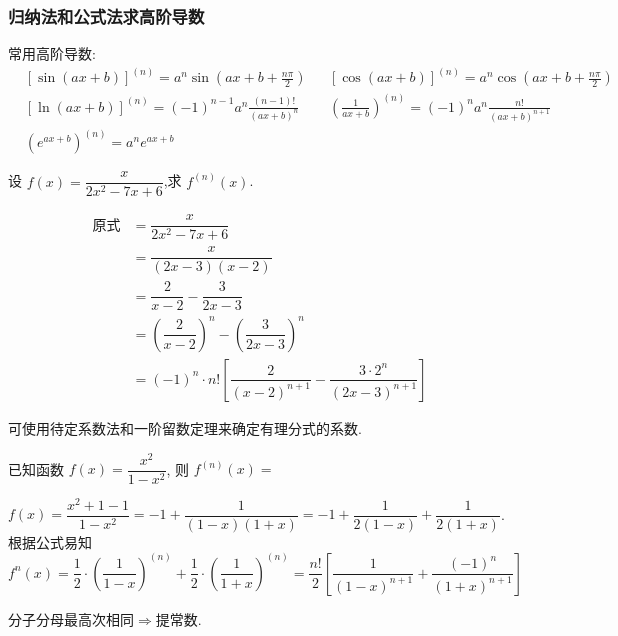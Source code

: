 \documentclass[8pt a4paper, oneside, UTF8]{ctexbook}  %
\begin{document}
\begin{sloppypar}
    \subsubsection{归纳法和公式法求高阶导数}
    常用高阶导数:
    $$
    \boxed{ \begin{aligned}
        &\left[\sin(ax+b)\right]^{(n)}=a^{n}\sin\left(ax+b+\frac{n\pi}{2}\right)&  &\left[\cos(ax+b)\right]^{(n)}=a^{n}\cos\left(ax+b+\frac{n\pi}{2}\right)  \\
        &\left[\ln(ax+b)\right]^{(n)}=(-1)^{n-1}a^{n}\frac{(n-1)!}{(ax+b)^{n}}  &  &\left(\frac{1}{ax+b}\right)^{(n)}=(-1)^{n}a^{n}\frac{n!}{(ax+b)^{n+1}}   \\
        & \left(e^{ax+b}\right)^{(n)}=a^{n}e^{ax+b}&  & 
       \end{aligned}}
    $$
    \begin{problem}
        设 $f(x)=\dfrac x{2x^2-7x+6}$,求 $f^{(n)}(x)$.   
    \end{problem}
    \begin{solution}
        \begin{align*}
          \text{原式} & = \dfrac{x}{2x^2-7x+6} \\     
          & =   \dfrac{x}{(2x-3)(x-2)}\\
          & = \dfrac{2}{x-2}-\dfrac{3}{2x-3}\\
          & = (\dfrac{2}{x-2})^n-(\dfrac{3}{2x-3})^n\\
          & = (-1)^{n}\cdot n![\dfrac{2}{(x-2)^{n+1}}-\dfrac{3\cdot2^{n}}{(2x-3)^{n+1}}]
        \end{align*} 
    \end{solution}
    \begin{note}
        可使用待定系数法和一阶留数定理来确定有理分式的系数.
    \end{note}
    \begin{problem}
        已知函数 $f(x)=\dfrac{x^2}{1-x^2}$, 则 $f^{(n)}(x)=$  
    \end{problem}
    \begin{solution}
        $f(x)=\dfrac{x^2+1-1}{1-x^2}=-1+\dfrac{1}{(1-x)(1+x)}=-1+\dfrac{1}{2(1-x)}+\dfrac{1}{2(1+x)}$.
        根据公式易知$f^n(x)=\dfrac{1}{2}\cdot(\dfrac{1}{1-x})^{(n)}+\dfrac{1}{2}\cdot(\dfrac{1}{1+x})^{(n)}=\dfrac{n!}{2}[\dfrac{1}{(1-x)^{n+1}}+\dfrac{(-1)^{n}}{(1+x)^{n+1}}]$
    \end{solution}
    \begin{note}
     分子分母最高次相同$\Longrightarrow$提常数.
    \end{note}

\end{sloppypar}
\end{document}
